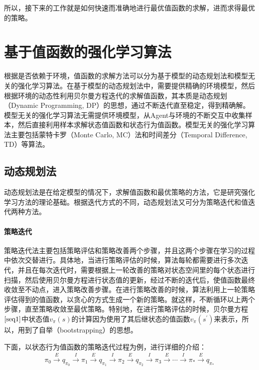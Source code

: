 所以，接下来的工作就是如何快速而准确地进行最优值函数的求解，进而求得最优的策略。

\section{基于值函数的强化学习算法}
根据是否依赖于环境，值函数的求解方法可以分为基于模型的动态规划法和模型无关的强化学习算法。在基于模型的动态规划法中，需要提供精确的环境模型，然后根据环境的动态性利用贝尔曼方程迭代的求解值函数，其本质是动态规划（Dynamic Programming, DP）的思想，通过不断迭代直至稳定，得到精确解。模型无关的强化学习算法无需提供环境模型，从Agent与环境的不断交互中收集样本，然后直接利用样本求解状态值函数和状态行为值函数。模型无关的强化学习算法主要包括蒙特卡罗（Monte Carlo, MC）法和时间差分（Temporal Difference, TD）等算法。

\subsection{动态规划法}
动态规划法是在给定模型的情况下，求解值函数和最优策略的方法，它是研究强化学习方法的理论基础。根据迭代方式的不同，动态规划法又可分为策略迭代和值迭代两种方法。
\paragraph{策略迭代}

策略迭代法主要包括策略评估和策略改善两个步骤，并且这两个步骤在学习的过程中依次交替进行。具体地，当进行策略评估的时候，算法每轮都需要进行多次迭代，并且在每次迭代时，需要根据上一轮改善的策略对状态空间里的每个状态进行扫描，然后使用贝尔曼方程进行状态值的更新，经过不断的迭代后，使值函数最终收敛至不动点，进入策略改善步骤。在进行策略改善的时候，算法利用上一轮策略评估得到的值函数，以贪心的方式生成一个新的策略。就这样，不断循环以上两个步骤，直至策略收敛至最优策略。特别地，在进行策略评估的时候，贝尔曼方程$\eqref{seq1}$中状态值$v_{\pi}(s)$的计算因为使用了其后继状态的值函数$v_{\pi}(s^{'})$来表示，所以，用到了自举（bootstrapping）的思想。

下面，以状态行为值函数的策略迭代过程为例，进行详细的介绍：
\begin{displaymath}
\begin{aligned}
\pi_{0}\xrightarrow{E}q_{\pi_0}\xrightarrow{I}\pi_{1}\xrightarrow{E}q_{\pi_1}\xrightarrow{I}\pi_{2}\xrightarrow{E}q_{\pi_2}\xrightarrow{I}\pi_{3}\xrightarrow{E} \cdots \xrightarrow{I}\pi_{*}\xrightarrow{E}q_{\pi_{*}}
\end{aligned}
\end{displaymath}

